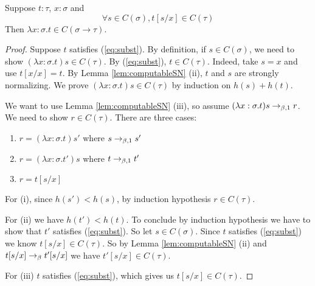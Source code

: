 \begin{boxlem}\label{lem:lambdaconstruct}
    Suppose $t : \tau$, $x : \sigma$ and
    \begin{equation}\label{eq:subst}
        \forall s \in C(\sigma), t[s/x] \in C(\tau) \tag{$*$}
    \end{equation}
    Then $\lambda x : \sigma. t \in C(\sigma \to \tau)$.
\end{boxlem}
\begin{proof}
    Suppose $t$ satisfies (\ref{eq:subst}). 
    By definition, if $s \in C(\sigma)$, we need to show $(\lambda x:\sigma.t)s \in C(\tau)$.
    By (\ref{eq:subst}), $t \in C(\tau)$. 
    Indeed, take $s = x$ and use $t[x/x] = t$. 
    By Lemma \ref{lem:computableSN} (ii), $t$ and $s$ are strongly normalizing. 
    We prove $(\lambda x : \sigma. t)s \in C(\tau)$ by induction on $h(s) + h(t)$. 

    We want to use Lemma \ref{lem:computableSN} (iii), so assume $(\lambda x: \sigma.t)s \to_{\beta, 1} r$. 
    We need to show $r \in C(\tau)$. 
    There are three cases: 
    \begin{enumerate}
        \item $r = (\lambda x : \sigma . t) s'$ where $s \to_{\beta, 1} s'$
        \item $r = (\lambda x : \sigma. t') s$ where $t \to_{\beta, 1} t'$
        \item $r = t[s/x]$
    \end{enumerate}
    For (i), since $h(s') < h(s)$, by induction hypothesis $r \in C(\tau)$. 

    For (ii) we have $h(t') < h(t)$. 
    To conclude by induction hypothesis we have to show that $t'$ satisfies (\ref{eq:subst}). 
    So let $s \in C(\sigma)$. 
    Since $t$ satisfies (\ref{eq:subst}) we know $t[s/x] \in C(\tau)$. 
    So by Lemma \ref{lem:computableSN} (ii) and $t[s/x] \to_{\beta} t'[s/x]$ we have $t'[s/x] \in C(\tau)$. 

    For (iii) $t$ satisfies (\ref{eq:subst}), which gives us $t[s/x] \in C(\tau)$. 
\end{proof}

